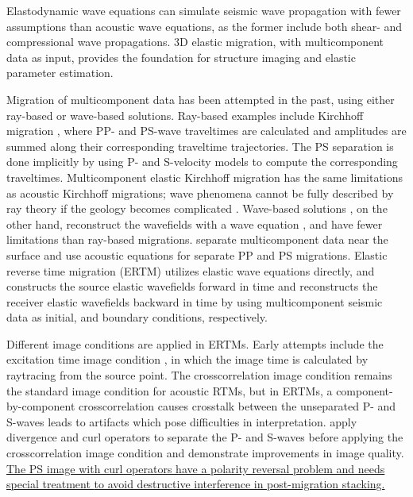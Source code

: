 \documentclass[manuscript,ulem,graphix,revised]{geophysics}
\begin{document}
Elastodynamic wave equations can simulate seismic wave propagation with fewer assumptions than acoustic wave equations, as the former include both shear- and compressional wave propagations. 3D elastic migration, with multicomponent data as input, provides the foundation for structure imaging and elastic parameter estimation.

Migration of multicomponent data has been attempted in the past, using either ray-based or wave-based solutions. Ray-based examples include Kirchhoff migration \citep{kuo84, dai86, hokstad00}, where PP- and PS-wave traveltimes are calculated and amplitudes are summed along their corresponding traveltime trajectories. The PS separation is done implicitly by using P- and S-velocity models to compute the corresponding traveltimes. Multicomponent elastic Kirchhoff migration has the same limitations as acoustic Kirchhoff migrations; wave phenomena cannot be fully described by ray theory if the geology becomes complicated \citep{gray01}. Wave-based solutions \citep{chang86,chang94,whitmore95}, on the other hand, reconstruct the wavefields with a wave equation \citep{wapenaar90}, and have fewer limitations than ray-based migrations. \citet{sun01} separate multicomponent data near the surface and use acoustic equations for separate PP and PS migrations. Elastic reverse time migration (ERTM) utilizes elastic wave equations directly, and constructs the source elastic wavefields forward in time and reconstructs the receiver elastic wavefields backward in time by using multicomponent seismic data as initial, and boundary conditions, respectively.

Different image conditions are applied in ERTMs. Early attempts include the excitation time image condition \citep{chang86}, in which the image time is calculated by raytracing from the source point. The crosscorrelation image condition \citep{claerbout85} remains the standard image condition for acoustic RTMs, but in ERTMs, a component-by-component crosscorrelation causes crosstalk between the unseparated P- and S-waves leads to artifacts which pose difficulties in interpretation. \citet{yan08} apply divergence and curl operators to separate the P- and S-waves before applying the crosscorrelation image condition and demonstrate improvements in image quality. \marginnote{[6]}\uline{The PS image with curl operators have a polarity reversal problem and needs special treatment \mbox{\citep{du12,du14}} to avoid destructive interference in post-migration stacking. }
\end{document}
